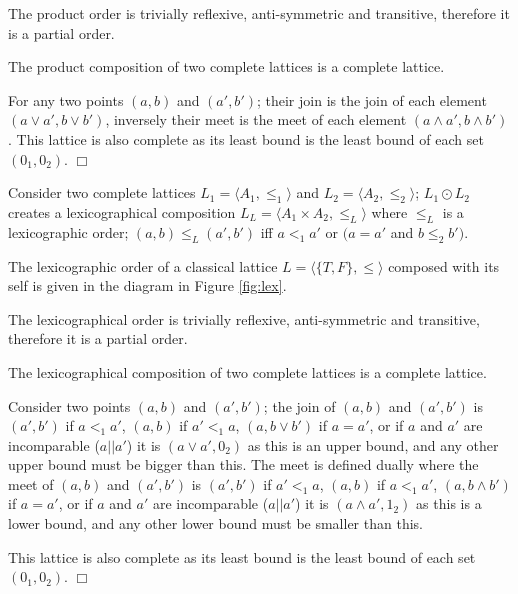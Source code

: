 The product order is trivially reflexive, anti-symmetric and transitive, therefore it is a partial order.
\begin{prop}
The product composition of two complete lattices is a complete lattice.  
\end{prop}
\begin{prof}
For any two points $(a,b)$ and $(a',b')$;
their join is the join of each element $(a \vee a', b \vee b')$, 
inversely their meet is the meet of each element $(a \wedge a', b \wedge b')$.
This lattice is also complete as its least bound is the least bound of each set $(0_1,0_2)$.
$\Box$\end{prof}

\begin{defs}
\label{def:lex_order}
Consider two complete lattices $L_1 = \langle A_1, \leq_1 \rangle$ and $L_2 = \langle A_2, \leq_2 \rangle$;
$L_1 \odot L_2$ creates a lexicographical composition  $L_L = \langle A_1 \times A_2, \leq_L \rangle$
where $\leq_L$ is a lexicographic order;
$(a,b) \leq_{L} (a',b')$ iff $a <_{1} a'$ or $(a = a'$ and $b \leq_{2} b')$.
\end{defs}

The lexicographic order of a classical lattice $L = \langle \{T,F\}, \leq \rangle$ 
composed with its self is given in the diagram in Figure \ref{fig:lex}.

The lexicographical order is trivially reflexive, anti-symmetric and transitive, therefore it is a partial order.
\begin{prop}
The lexicographical composition of two complete lattices is a complete lattice.
\end{prop}
\begin{prof}
Consider two points $(a,b)$ and $(a',b')$; 
the join of $(a,b)$ and $(a',b')$ is $(a',b')$ if $a <_1 a'$,
$(a,b)$ if $a' <_1 a$,
$(a, b \vee b')$ if $a = a'$,
or if $a$ and $a'$ are incomparable ($a||a'$) it is $(a \vee a', 0_2)$
as this is an upper bound, and any other upper bound must be bigger than this.
The meet is defined dually where the meet of $(a,b)$ and $(a',b')$ is $(a',b')$ if $a' <_1 a$,
$(a,b)$ if $a <_1 a'$,
$(a, b \wedge b')$ if $a = a'$,
or if $a$ and $a'$ are incomparable ($a||a'$) it is $(a \wedge a',1_2)$
as this is a lower bound, and any other lower bound must be smaller than this.

This lattice is also complete as its least bound is the least bound of each set $(0_1,0_2)$.
$\Box$\end{prof}

